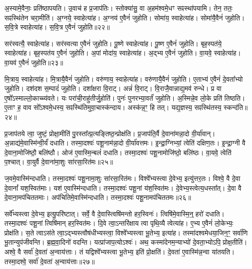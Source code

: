 अ॒स्यामे॒वैनाः॒ प्रति॑\-ष्ठापयति।
उ॒वाच॑ ह प्र॒जा\-प॑तिः।
स्तोक्या॑सु॒ वा अ॒हम॑श्वमे॒धꣳ सꣴस्था॑पयामि।
तेन॒ ततः॒ सꣴस्थि॑तेन चरा॒मीति॑।
अ॒ग्नये॒ स्वाहेत्या॑ह।
अ॒ग्नय॑ ए॒वैनं॑ जुहोति।
सोमा॑य॒ स्वाहेत्या॑ह।
सोमा॑यै॒वैनं॑ जुहोति।
स॒वि॒त्रे स्वाहेत्या॑ह।
स॒वि॒त्र ए॒वैनं॑ जुहोति॥२२॥\ip

सर॑स्वत्यै॒ स्वाहेत्या॑ह।
सर॑स्वत्या ए॒वैनं॑ जुहोति।
पू॒ष्णे स्वाहेत्या॑ह।
पू॒ष्ण ए॒वैनं॑ जुहोति।
बृह॒स्पत॑ये॒ स्वाहेत्या॑ह।
बृह॒स्पत॑य ए॒वैनं॑ जुहोति।
अ॒पां मोदा॑य॒ स्वाहेत्या॑ह।
अ॒द्भ्य ए॒वैनं॑ जुहोति।
वा॒यवे॒ स्वाहेत्या॑ह।
वा॒यव॑ ए॒वैनं॑ जुहोति॥२३॥\ip

मि॒त्राय॒ स्वाहेत्या॑ह।
मि॒त्रायै॒वैनं॑ जुहोति।
वरु॑णाय॒ स्वाहेत्या॑ह।
वरु॑णायै॒वैनं॑ जुहोति।
ए॒ताभ्य॑ ए॒वैनं॑ दे॒वता᳚भ्यो जुहोति।
दश॑दश स॒म्पादं॑ जुहोति।
दशा᳚क्षरा वि॒राट्।
अन्नं॑ वि॒राट्।
वि॒राजै॒वान्नाद्य॒मव॑ रुन्धे।
प्र वा ए॒षो᳚\-ऽस्माल्लो॒काच्च्य॑वते।
यः परा॑ची॒राहु॑तीर्जु॒होति॑।
पुनः॑ पुनरभ्या॒वर्तं॑ जुहोति।
अ॒स्मिन्ने॒व लो॒के प्रति॑ तिष्ठति।
ए॒ताꣳ ह॒ वाव सो᳚\-ऽश्वमे॒धस्य॒ सꣴस्थि॑तिमुवा॒चास्क॑न्दाय।
अस्क॑न्न॒ꣳ॒ हि तत्।
यद्य॒ज्ञस्य॒ सꣴस्थि॑तस्य॒ स्कन्द॑ति॥२४॥\ip\anuvakamend[अ॒भिजि॑त्यै वैश्वान॒रः स॑वि॒त्र ए॒वैनं॑ जुहोति वा॒यव॑ ए॒वैनं॑ जुहोति च्यवते॒ षट् च॑]

प्र॒जा\-प॑तये त्वा॒ जुष्टं॒ प्रोक्षा॒मीति॑ पु॒रस्ता᳚त्प्र॒त्यङ्तिष्ठ॒न्प्रोक्ष॑ति।
प्र॒जा\-प॑ति॒र्वै दे॒वाना॑मन्ना॒दो वी॒र्या॑वान्।
अ॒न्नाद्य॑मे॒वास्मि॑न्वी॒र्यं॑ दधाति।
तस्मा॒दश्वः॑ पशू॒नाम॑न्ना॒दो वी॒र्या॑वत्तमः।
इ॒न्द्रा॒ग्निभ्यां॒ त्वेति॑ दक्षिण॒तः।
इ॒न्द्रा॒ग्नी वै दे॒वाना॒मोजि॑ष्ठौ॒ बलि॑ष्ठौ।
ओज॑ ए॒वास्मि॒न्बलं॑ दधाति।
तस्मा॒दश्वः॑ पशू॒नामोजि॑ष्ठो॒ बलि॑ष्ठः।
वा॒यवे॒ त्वेति॑ प॒श्चात्।
वा॒युर्वै दे॒वाना॑मा॒शुः सा॑रसा॒रित॑मः॥२५॥\ip

ज॒वमे॒वास्मि॑न्दधाति।
तस्मा॒दश्वः॑ पशू॒नामा॒शुः सा॑रसा॒रित॑मः।
विश्वे᳚भ्यस्त्वा दे॒वेभ्य॒ इत्यु॑त्तर॒तः।
विश्वे॒ वै दे॒वा दे॒वानां᳚ यश॒स्वित॑माः।
यश॑ ए॒वास्मि॑न्दधाति।
तस्मा॒दश्वः॑ पशू॒नां य॑श॒स्वित॑मः।
दे॒वेभ्य॒स्त्वेत्य॒धस्ता᳚त्।
दे॒वा वै दे॒वाना॒मप॑चिततमाः।
अप॑चितिमे॒वास्मि॑न्दधाति।
तस्मा॒दश्वः॑ पशू॒नामप॑चिततमः॥२६॥\ip

सर्वे᳚भ्यस्त्वा दे॒वेभ्य॒ इत्यु॒परि॑ष्टात्।
सर्वे॒ वै दे॒वास्त्विषि॑मन्तो हर॒स्विनः॑।
त्विषि॑मे॒वास्मि॒न्॒ हरो॑ दधाति।
तस्मा॒दश्वः॑ पशू॒नां त्विषि॑मान्‌ हर॒स्वित॑मः।
दि॒वे त्वा॒\-ऽन्तरि॑क्षाय त्वा पृथि॒व्यै त्वेत्या॑ह।
ए॒भ्य ए॒वैनं॑ लो॒केभ्यः॒ प्रोक्ष॑ति।
स॒ते त्वा\-ऽस॑ते त्वा॒\-ऽद्भ्यस्त्वौष॑धीभ्यस्त्वा॒ विश्वे᳚भ्यस्त्वा भू॒तेभ्य॒ इत्या॑ह।
तस्मा॑दश्वमेधया॒जिन॒ꣳ॒ सर्वा॑णि भू॒तान्युप॑जीवन्ति।
ब्र॒ह्म॒वा॒दिनो॑ वदन्ति।
यत्प्रा॑जाप॒त्यो\-ऽश्वः॑।
अथ॒ कस्मा॑देनम॒न्याभ्यो॑ दे॒वता॒भ्योऽपि॒ प्रोक्ष॒तीति॑।
अश्वे॒ वै सर्वा॑ दे॒वता॑ अ॒न्वाय॑त्ताः।
तं यद्विश्वे᳚भ्यस्त्वा भू॒तेभ्य॒ इति॑ प्रो॒क्षति॑।
दे॒वता॑ ए॒वास्मि॑न्न॒न्वा या॑तयति।
तस्मा॒दश्वे॒ सर्वा॑ दे॒वता॑ अ॒न्वाय॑त्ताः॥२७॥\ip\anuvakamend[सा॒र॒सा॒रित॒मो\-ऽप॑चिततमः प्राजाप॒त्यो\-ऽश्वः॒ पञ्च॑ च]

